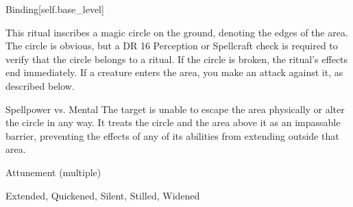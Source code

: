 \begin{spellsection}{Binding}[self.base_level]
\begin{spellcontent}
\begin{spelltargetinginfo}
\end{spelltargetinginfo}
\begin{spelleffects}
\spelleffect
This ritual inscribes a magic circle on the ground, denoting the edges of the area.
The circle is obvious, but a DR 16 Perception or Spellcraft check is required to verify that the circle belongs to a  ritual.
If the circle is broken, the ritual's effects end immediately.
If a creature enters the area, you make an attack against it, as described below.
\begin{spellattack}{Spellpower vs. Mental}
\spellsuccess
The target is unable to escape the area physically or alter the circle in any way.
It treats the circle and the area above it as an impassable barrier, preventing the effects of any of its abilities from extending outside that area.
\end{spellattack}
\spelldur Attunement (multiple)
\end{spelleffects}
\end{spellcontent}
\begin{spellfooter}
 Extended, Quickened, Silent, Stilled, Widened
\end{spellfooter}
\begin{spellsubcontent}
\end{spellsubcontent}
\end{spellsection}
